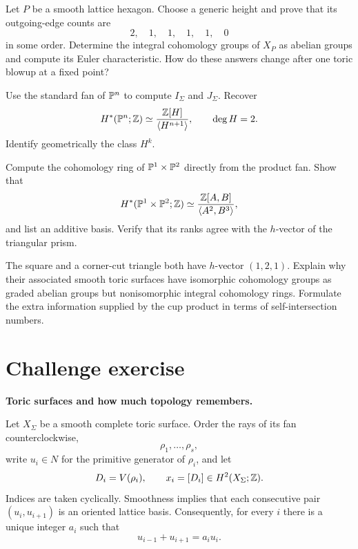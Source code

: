 \begin{exercises}
\item Let \(P\) be a smooth lattice hexagon. Choose a generic height
and prove that its outgoing-edge counts are
\[
2,\quad1,\quad1,\quad1,\quad1,\quad0
\]
in some order. Determine the integral cohomology groups of \(X_P\)
as abelian groups and compute its Euler characteristic. How do these
answers change after one toric blowup at a fixed point?

\item Use the standard fan of \(\mathbb{P}^n\) to compute \(I_\Sigma\) and
\(J_\Sigma\). Recover
\[
H^*(\mathbb{P}^n;\mathbb{Z})
\simeq
\frac{\mathbb{Z}[H]}{\langle H^{n+1}\rangle},
\qquad
\deg H=2.
\]
Identify geometrically the class \(H^k\).

\item Compute the cohomology ring of \(\mathbb{P}^1\times\mathbb{P}^2\) directly
from the product fan. Show that
\[
H^*(\mathbb{P}^1\times\mathbb{P}^2;\mathbb{Z})
\simeq
\frac{\mathbb{Z}[A,B]}{\langle A^2,B^3\rangle},
\]
and list an additive basis. Verify that its ranks agree with the
\(h\)-vector of the triangular prism.

\item The square and a corner-cut triangle both have \(h\)-vector
\((1,2,1)\). Explain why their associated smooth toric surfaces have
isomorphic cohomology groups as graded abelian groups but nonisomorphic
integral cohomology rings. Formulate the extra information supplied by
the cup product in terms of self-intersection numbers.

\end{exercises}

\clearpage
\section*{Challenge exercise}

\noindent
\textbf{Toric surfaces and how much topology remembers.}

\medskip

Let \(X_\Sigma\) be a smooth complete toric surface. Order the rays of
its fan counterclockwise,
\[
\rho_1,\ldots,\rho_s,
\]
write \(u_i\in N\) for the primitive generator of \(\rho_i\), and let
\[
D_i=V(\rho_i),
\qquad
x_i=[D_i]\in H^2(X_\Sigma;\mathbb{Z}).
\]
Indices are taken cyclically. Smoothness implies that each consecutive
pair \((u_i,u_{i+1})\) is an oriented lattice basis. Consequently,
for every \(i\) there is a unique integer \(a_i\) such that
\[
\boxed{u_{i-1}+u_{i+1}=a_i u_i.}
\]


